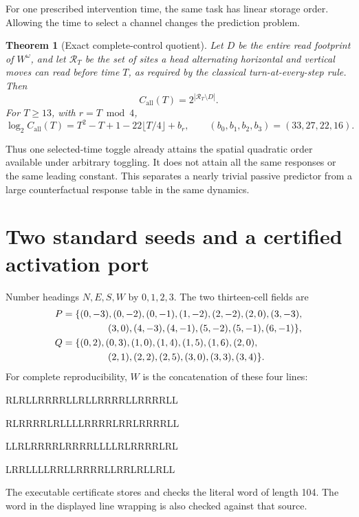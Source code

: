 \documentclass[11pt]{article}
\newtheorem{theorem}{Theorem}
\theoremstyle{definition}\newtheorem{definition}[theorem]{Definition}
\newcommand{\RR}{\mathcal R_T}
\begin{document}
For one prescribed intervention time, the same task has linear storage
order. Allowing the time to select a channel changes the prediction problem.

\begin{theorem}[Exact complete-control quotient]\label{th:all}
Let $D$ be the entire read footprint of $W^\omega$, and let $\RR$ be the set of
sites a head alternating horizontal and vertical moves can read before
time $T$, as required by the classical turn-at-every-step rule. Then
\[
C_{\mathrm{all}}(T)=2^{|\RR\setminus D|}.
\]
For $T\ge13$, with $r=T\bmod4$,
\begin{equation}\label{eq:all}
\log_2 C_{\mathrm{all}}(T)
=T^2-T+1-22\lfloor T/4\rfloor+b_r,
\qquad (b_0,b_1,b_2,b_3)=(33,27,22,16).
\end{equation}
\end{theorem}

Thus one selected-time toggle already attains the spatial quadratic order
available under arbitrary toggling. It does not attain all the same responses
or the same leading constant. This separates a nearly trivial passive
predictor from a large counterfactual response table in the same dynamics.

\section{Two standard seeds and a certified activation port}\label{sec:seeds}
Number headings $N,E,S,W$ by $0,1,2,3$. The two thirteen-cell fields are
\begin{align*}
P={}&\{(0,-3),(0,-2),(0,-1),(1,-2),(2,-2),(2,0),(3,-3),\\
 &\hspace{12mm}(3,0),(4,-3),(4,-1),(5,-2),(5,-1),(6,-1)\},\\
Q={}&\{(0,2),(0,3),(1,0),(1,4),(1,5),(1,6),(2,0),\\
 &\hspace{12mm}(2,1),(2,2),(2,5),(3,0),(3,3),(3,4)\}.
\end{align*}
For complete reproducibility, $W$ is the concatenation of these four lines:
\begin{center}\small\ttfamily
RLRLLRRRRLLRLLRRRRLLRRRRLL\par
RLRRRRLRLLLLRRRRLRRLRRRRLL\par
LLRLRRRRLRRRRLLLLRLRRRRLRL\par
LRRLLLLRRLLRRRRLLRRLRLLRLL
\end{center}
The executable certificate stores and checks the literal word of length 104.
The word in the displayed line wrapping is also checked against that source.
\end{document}
